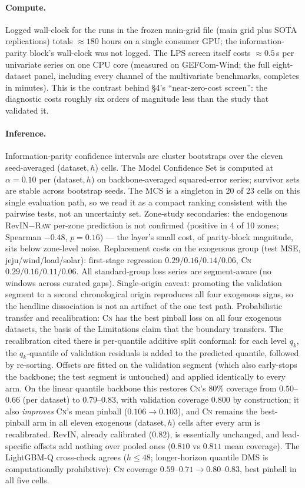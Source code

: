\documentclass{article}
\newcommand{\lps}{\ensuremath{\mathrm{LPS}}}
\newcommand{\rawm}{\textsc{Raw}}
\newcommand{\cnm}{\textsc{Cn}}
\begin{document}
\paragraph{Compute.} Logged wall-clock for the runs in the frozen main-grid file
(main grid plus SOTA replications) totals ${\approx}180$ hours on a single
consumer GPU; the information-parity block's wall-clock was not logged. The
\lps{} screen itself costs ${\approx}0.5$\,s per univariate series on one CPU
core (measured on GEFCom-Wind; the full eight-dataset panel, including every
channel of the multivariate benchmarks, completes in minutes). This is the
contrast behind \S4's ``near-zero-cost screen'': the diagnostic costs roughly
six orders of magnitude less than the study that validated it.

\paragraph{Inference.} Information-parity confidence intervals are cluster
bootstraps over the eleven seed-averaged (dataset,\,$h$) cells. The Model
Confidence Set is computed at $\alpha=0.10$ per (dataset,\,$h$) on
backbone-averaged squared-error series; survivor sets are stable across bootstrap
seeds. The MCS is a singleton in 20 of 23 cells on this single evaluation path,
so we read it as a compact ranking consistent with the pairwise tests, not an
uncertainty set. Zone-study secondaries: the endogenous RevIN$-$\rawm{} per-zone
prediction is not confirmed (positive in 4 of 10 zones; Spearman $-0.48$,
$p{=}0.16$) --- the layer's small cost, of parity-block magnitude, sits below
zone-level noise. Replacement costs on the exogenous group (test MSE,
jeju/wind/load/solar): first-stage regression $0.29/0.16/0.14/0.06$, \cnm{}
$0.29/0.16/0.11/0.06$. All standard-group loss series are segment-aware (no
windows across curated gaps). Single-origin caveat: promoting the validation
segment to a second chronological origin reproduces all four exogenous signs,
so the headline dissociation is not an artifact of the one test path.
Probabilistic transfer and recalibration: \cnm{} has the best pinball loss on
all four exogenous datasets, the basis of the Limitations claim that the
boundary transfers. The recalibration cited there is per-quantile additive
split conformal: for each level $q_k$, the $q_k$-quantile of validation
residuals is added to the predicted quantile, followed by re-sorting. Offsets
are fitted on the validation segment (which also early-stops the backbone;
the test segment is untouched) and applied identically to every arm. On the
linear quantile backbone this restores \cnm's $80\%$ coverage from
$0.50$--$0.66$ (per dataset) to $0.79$--$0.83$, with validation coverage
$0.800$ by construction; it also \emph{improves} \cnm's mean pinball
($0.106 \to 0.103$), and \cnm{} remains the best-pinball arm in all eleven
exogenous (dataset,\,$h$) cells after every arm is recalibrated. RevIN,
already calibrated ($0.82$), is essentially unchanged, and lead-specific
offsets add nothing over pooled ones ($0.810$ vs $0.811$ mean coverage). The
LightGBM-Q cross-check agrees ($h\le48$; longer-horizon quantile DMS is
computationally prohibitive): \cnm{} coverage $0.59$--$0.71 \to
0.80$--$0.83$, best pinball in all five cells.
\end{document}
